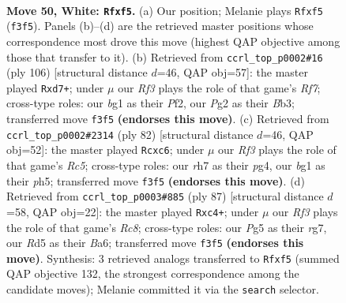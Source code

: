 \documentclass[11pt]{article}
\begin{document}
\clearpage

\begin{figure}[p]\centering
\begin{subfigure}{0.46\textwidth}\centering
\resizebox{\linewidth}{!}{%
\newchessgame
\chessboard[
  setfen={4kr2/7r/4n3/3R1nPp/P3N3/5R2/6P1/4K1b1 w - - 0 50},
  showmover=false,
  pgfstyle=straightmove, color=movearrow, markmove={f3-f5}
]}
\caption{}
\end{subfigure}\hfill
\begin{subfigure}{0.46\textwidth}\centering
\resizebox{\linewidth}{!}{%
\newchessgame
\chessboard[
  setfen={3k2r1/2rn1R2/6N1/6P1/1p1P4/1B6/5PK1/8 w - - 1 54},
  showmover=false,
  pgfstyle=straightmove, color=movearrow, markmove={f7-d7}
]}
\caption{}
\end{subfigure}
\\[4pt]
\begin{subfigure}{0.46\textwidth}\centering
\resizebox{\linewidth}{!}{%
\newchessgame
\chessboard[
  setfen={2r5/4rpk1/1PnR4/2R4p/6p1/8/2P4P/2K5 w - - 0 42},
  showmover=false,
  pgfstyle=straightmove, color=movearrow, markmove={c5-c6}
]}
\caption{}
\end{subfigure}\hfill
\begin{subfigure}{0.46\textwidth}\centering
\resizebox{\linewidth}{!}{%
\newchessgame
\chessboard[
  setfen={1k6/2R3R1/b7/8/K1N1P2P/p6r/P7/2r5 b - - 5 44},
  showmover=false,
  pgfstyle=straightmove, color=movearrow, markmove={c1-c4}
]}
\caption{}
\end{subfigure}
\caption{\textbf{Move 50, White: \texttt{Rfxf5}.} (a) Our position; Melanie plays \texttt{Rfxf5} (\texttt{f3f5}). Panels (b)--(d) are the retrieved master positions whose correspondence most drove this move (highest QAP objective among those that transfer to it). (b) Retrieved from \texttt{ccrl\_top\_p0002\#16} (ply 106) [structural distance $d$=46, QAP obj=57]: the master played \texttt{Rxd7+}; under $\mu$ our \emph{Rf3} plays the role of that game's \emph{Rf7}; cross-type roles: our \emph{b}g1 as their \emph{P}f2, our \emph{P}g2 as their \emph{B}b3; transferred move \texttt{f3f5} \textbf{(endorses this move)}. (c) Retrieved from \texttt{ccrl\_top\_p0002\#2314} (ply 82) [structural distance $d$=46, QAP obj=52]: the master played \texttt{Rcxc6}; under $\mu$ our \emph{Rf3} plays the role of that game's \emph{Rc5}; cross-type roles: our \emph{r}h7 as their \emph{p}g4, our \emph{b}g1 as their \emph{p}h5; transferred move \texttt{f3f5} \textbf{(endorses this move)}. (d) Retrieved from \texttt{ccrl\_top\_p0003\#885} (ply 87) [structural distance $d$=58, QAP obj=22]: the master played \texttt{Rxc4+}; under $\mu$ our \emph{Rf3} plays the role of that game's \emph{Rc8}; cross-type roles: our \emph{P}g5 as their \emph{r}g7, our \emph{R}d5 as their \emph{B}a6; transferred move \texttt{f3f5} \textbf{(endorses this move)}. Synthesis: 3 retrieved analogs transferred to \texttt{Rfxf5} (summed QAP objective 132, the strongest correspondence among the candidate moves); Melanie committed it via the \texttt{search} selector.}
\label{fig:thought-m98}
\end{figure}
\end{document}
